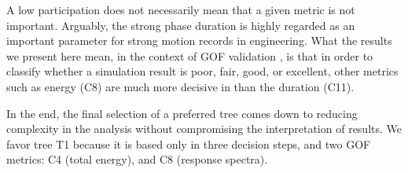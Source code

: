 A low participation does not necessarily mean that a given metric is not important. Arguably, the strong phase duration is highly regarded as an important parameter for strong motion records in engineering. What the results we present here mean, in the context of GOF validation  , is that in order to classify whether a simulation result is poor, fair, good, or excellent, other metrics such as energy (C8) are much more decisive in    than the duration (C11).

In the end, the final selection of a preferred tree comes down to reducing complexity in the analysis without compromising the interpretation of results. We favor tree T1 because it is based only in three decision steps, and two GOF metrics: C4 (total energy), and C8 (response spectra).




